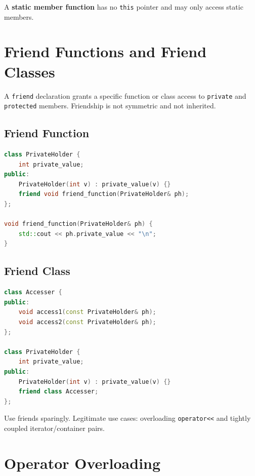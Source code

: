A \textbf{static member function} has no \texttt{this} pointer and may only access static members.

\section{Friend Functions and Friend Classes}
\label{sec:friends}

A \texttt{friend} declaration grants a specific function or class access to \texttt{private} and \texttt{protected} members. Friendship is not symmetric and not inherited.

\subsection{Friend Function}

\begin{lstlisting}[language=C++, caption={Friend function accessing private data}]
class PrivateHolder {
    int private_value;
public:
    PrivateHolder(int v) : private_value(v) {}
    friend void friend_function(PrivateHolder& ph);
};

void friend_function(PrivateHolder& ph) {
    std::cout << ph.private_value << "\n";
}
\end{lstlisting}

\subsection{Friend Class}

\begin{lstlisting}[language=C++, caption={Friend class given full access}]
class Accesser {
public:
    void access1(const PrivateHolder& ph);
    void access2(const PrivateHolder& ph);
};

class PrivateHolder {
    int private_value;
public:
    PrivateHolder(int v) : private_value(v) {}
    friend class Accesser;
};
\end{lstlisting}

Use friends sparingly. Legitimate use cases: overloading \texttt{operator<<} and tightly coupled iterator/container pairs.

\section{Operator Overloading}
\label{sec:operator-overloading}

